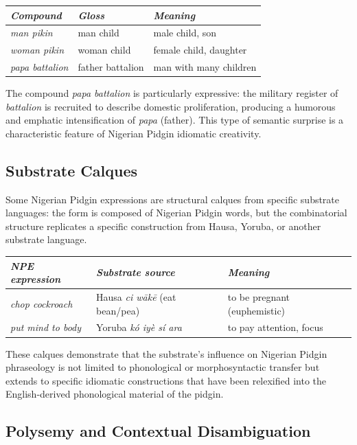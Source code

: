 \documentclass[12pt]{article}
\begin{document}
\begin{center}
\begin{tabular}{lll}
\textit{Compound} & \textit{Gloss} & \textit{Meaning} \\
\hline
\textit{man pikin} & man child & male child, son \\
\textit{woman pikin} & woman child & female child, daughter \\
\textit{papa battalion} & father battalion & man with many children \\
\end{tabular}
\end{center}

The compound \textit{papa battalion} is particularly expressive: the military register of \textit{battalion} is recruited to describe domestic proliferation, producing a humorous and emphatic intensification of \textit{papa} (father). This type of semantic surprise is a characteristic feature of Nigerian Pidgin idiomatic creativity.

\subsection{Substrate Calques}

Some Nigerian Pidgin expressions are structural calques from specific substrate languages: the form is composed of Nigerian Pidgin words, but the combinatorial structure replicates a specific construction from Hausa, Yoruba, or another substrate language.

\begin{center}
\begin{tabular}{lll}
\textit{NPE expression} & \textit{Substrate source} & \textit{Meaning} \\
\hline
\textit{chop cockroach} & Hausa \textit{ci wākē} (eat bean/pea) & to be pregnant (euphemistic) \\
\textit{put mind to body} & Yoruba \textit{kó iyè sí ara} & to pay attention, focus \\
\end{tabular}
\end{center}

These calques demonstrate that the substrate's influence on Nigerian Pidgin phraseology is not limited to phonological or morphosyntactic transfer but extends to specific idiomatic constructions that have been relexified into the English-derived phonological material of the pidgin.

\subsection{Polysemy and Contextual Disambiguation}
\end{document}
